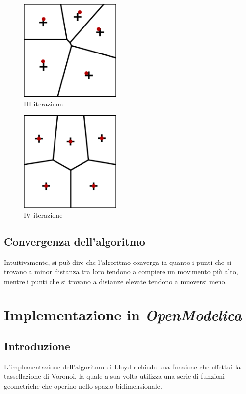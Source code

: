 \documentclass[10pt,a4paper]{article}
\begin{document}
\begin{figure}[H]
\includegraphics[width=5cm]{lloyd_iterazione_3.png}
\centering
\caption{III iterazione}
\end{figure}

\begin{figure}[H]
\includegraphics[width=5cm]{lloyd_iterazione_4.png}
\centering
\caption{IV iterazione}
\end{figure}

\subsection{Convergenza dell'algoritmo}

Intuitivamente, si può dire che l'algoritmo converga in quanto i punti che si trovano a minor distanza tra loro tendono a compiere un movimento più alto, mentre i punti che si trovano a distanze elevate tendono a muoversi meno.

\pagebreak

\section{Implementazione in \textit{OpenModelica}}

\subsection{Introduzione}

L'implementazione dell'algoritmo di Lloyd richiede una funzione che effettui la tassellazione di Voronoi, la quale a sua volta utilizza una serie di funzioni geometriche che operino nello spazio bidimensionale.
\end{document}
